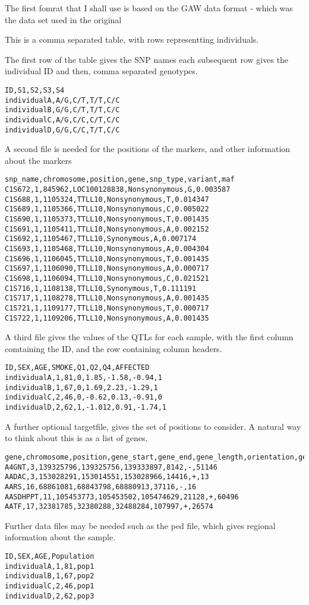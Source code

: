 \documentclass[a4paper,10pt]{article}
\begin{document}
The first fomrat that I shall use is based on the GAW data format  - which was the data set used in the 
original 

This is a comma separated table, with rows representting individuals.

The first row of the table gives the SNP names
each subsequent row gives the individual ID and then, comma separated genotypes.


\begin{verbatim}
ID,S1,S2,S3,S4
individualA,A/G,C/T,T/T,C/C
individualB,G/G,C/T,T/T,C/C
individualC,A/G,C/C,C/T,C/C
individualD,G/G,C/C,T/T,C/C
\end{verbatim}
A second file is needed for the positions of the markers, and other information about the markers


\begin{verbatim}
snp_name,chromosome,position,gene,snp_type,variant,maf
C1S672,1,845962,LOC100128838,Nonsynonymous,G,0.003587
C1S688,1,1105324,TTLL10,Nonsynonymous,T,0.014347
C1S689,1,1105366,TTLL10,Nonsynonymous,C,0.005022
C1S690,1,1105373,TTLL10,Nonsynonymous,T,0.001435
C1S691,1,1105411,TTLL10,Nonsynonymous,A,0.002152
C1S692,1,1105467,TTLL10,Synonymous,A,0.007174
C1S693,1,1105468,TTLL10,Nonsynonymous,A,0.004304
C1S696,1,1106045,TTLL10,Nonsynonymous,T,0.001435
C1S697,1,1106090,TTLL10,Nonsynonymous,A,0.000717
C1S698,1,1106094,TTLL10,Nonsynonymous,C,0.021521
C1S716,1,1108138,TTLL10,Synonymous,T,0.111191
C1S717,1,1108278,TTLL10,Nonsynonymous,A,0.001435
C1S721,1,1109177,TTLL10,Nonsynonymous,T,0.000717
C1S722,1,1109206,TTLL10,Nonsynonymous,A,0.001435
\end{verbatim}

A third file gives the values of the QTLs for each sample, with the first column
comtaining the ID, and the row containing column headers.
\begin{verbatim}
ID,SEX,AGE,SMOKE,Q1,Q2,Q4,AFFECTED
individualA,1,81,0,1.85,-1.58,-0.94,1
individualB,1,67,0,1.69,2.23,-1.29,1
individualC,2,46,0,-0.62,0.13,-0.91,0
individualD,2,62,1,-1.012,0.91,-1.74,1
\end{verbatim}

A further optional targetfile, gives the set of positions to consider.  A natural way to think about this is 
as a list of genes.

\begin{verbatim}
gene,chromosome,position,gene_start,gene_end,gene_length,orientation,geneid
A4GNT,3,139325796,139325756,139333897,8142,-,51146
AADAC,3,153028291,153014551,153028966,14416,+,13
AARS,16,68861081,68843798,68880913,37116,-,16
AASDHPPT,11,105453773,105453502,105474629,21128,+,60496
AATF,17,32381785,32380288,32488284,107997,+,26574
\end{verbatim}


Further data files may be needed such as the ped file, which gives regional information about the sample.

\begin{verbatim}
ID,SEX,AGE,Population
individualA,1,81,pop1
individualB,1,67,pop2
individualC,2,46,pop1
individualD,2,62,pop3
\end{verbatim}
\end{document}
